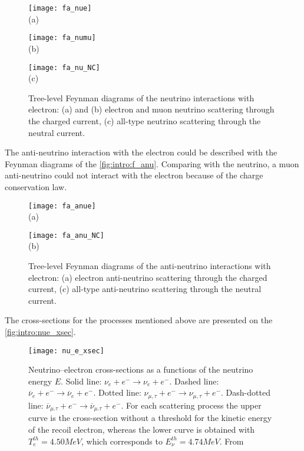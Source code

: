 \documentclass[../main.tex]{subfiles}
\begin{document}
\begin{figure}[!ht]
\centering
  \begin{minipage}[t]{0.29\linewidth}
    \centering
    \texttt{[image: fa\_nue]} \\ (a)
  \end{minipage}
  \begin{minipage}[t]{0.29\linewidth}
    \centering
    \texttt{[image: fa\_numu]} \\ (b)
  \end{minipage}
  \begin{minipage}[t]{0.29\linewidth}
    \centering
    \texttt{[image: fa\_nu\_NC]} \\ (c)
  \end{minipage}
  \caption{Tree-level Feynman diagrams of the neutrino interactions with electron: (a) and (b) electron and muon neutrino scattering through the charged current, (c) all-type neutrino scattering through the neutral current.}
  \label{fig:intro:f_nu}
\end{figure}

The anti-neutrino interaction with the electron could be described with the Feynman diagrams of the \autoref{fig:intro:f_anu}. Comparing with the neutrino, a muon anti-neutrino could not interact with the electron because of the charge conservation law.

\begin{figure}[!ht]
\centering
  \begin{minipage}[t]{0.29\linewidth}
    \centering
    \texttt{[image: fa\_anue]} \\ (a)
  \end{minipage}
  \begin{minipage}[t]{0.29\linewidth}
    \centering
    \texttt{[image: fa\_anu\_NC]} \\ (b)
    \end{minipage}
  \caption{Tree-level Feynman diagrams of the anti-neutrino interactions with electron: (a) electron anti-neutrino scattering through the charged current, (c) all-type anti-neutrino scattering through the neutral current.}
  \label{fig:intro:f_anu}
\end{figure}

The cross-sections for the processes mentioned above are presented on the \autoref{fig:intro:nue_xsec}.

\begin{figure}[!ht]
  \centering
  \texttt{[image: nu\_e\_xsec]}
  \caption{Neutrino–electron cross-sections as a functions of the neutrino energy $E$. Solid line: $\nu_e+e^-\to\nu_e+e^-$. Dashed line: $\overline{\nu}_e+e^-\to\overline{\nu}_e+e^-$. Dotted line: $\nu_{\mu, \tau}+e^-\to\nu_{\mu, \tau}+e^-$. Dash-dotted line: $\overline{\nu}_{\mu. \tau}+e^-\to\overline{\nu}_{\mu. \tau}+e^-$. For each scattering process the upper curve is the cross-section without a threshold for the kinetic energy of the recoil electron, whereas the lower curve is obtained with $T_e^{th}=4.50 MeV$, which corresponds to $E_\nu^{th} = 4.74 MeV$. From~\cite{Auerbach2001}}
  \label{fig:intro:nue_xsec}
\end{figure}
\end{document}
